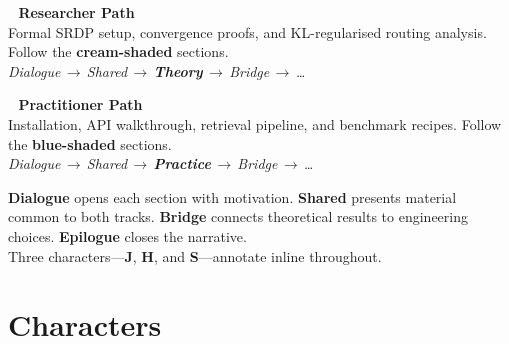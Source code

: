 \documentclass[11pt,a4paper]{article}
\begin{document}
\begin{tcolorbox}[
  enhanced, colback=white, colframe=black!30, boxrule=1pt,
  width=0.92\textwidth, arc=6pt, shadow={2pt}{-2pt}{0pt}{black!10}
]
\vspace{10pt}
\raggedright
\begin{minipage}[t]{0.47\textwidth}
  \colorbox{theoryBG}{\color{trackR}\textbf{\,\faFlask~Researcher Path\,}}\\[4pt]
  {\footnotesize Formal SRDP setup, convergence proofs, and KL-regularised routing analysis.
  Follow the \textbf{cream-shaded} sections.\\[2pt]
  \textit{Dialogue\,$\to$\,Shared\,$\to$\,\textbf{Theory}\,$\to$\,Bridge\,$\to$\,\ldots}}
\end{minipage}
\hfill
\begin{minipage}[t]{0.47\textwidth}
  \colorbox{practiceBG}{\color{trackP}\textbf{\,\faCode~Practitioner Path\,}}\\[4pt]
  {\footnotesize Installation, API walkthrough, retrieval pipeline, and benchmark recipes.
  Follow the \textbf{blue-shaded} sections.\\[2pt]
  \textit{Dialogue\,$\to$\,Shared\,$\to$\,\textbf{Practice}\,$\to$\,Bridge\,$\to$\,\ldots}}
\end{minipage}

\vspace{8pt}
{\footnotesize
\colorbox{dialogueBG}{\textbf{Dialogue}} opens each section with motivation.\quad
\colorbox{sharedBG}{\textbf{Shared}} presents material common to both tracks.\quad
\colorbox{bridgeBG}{\textbf{Bridge}} connects theoretical results to engineering choices.\quad
\colorbox{epilogueBG}{\textbf{Epilogue}} closes the narrative.\quad
\\ Three characters---\textbf{\color{marginJ}J}, \textbf{\color{marginH}H}, and \textbf{\color{marginS}S}---annotate inline throughout.}
\end{tcolorbox}


\section{Characters}
\end{document}
